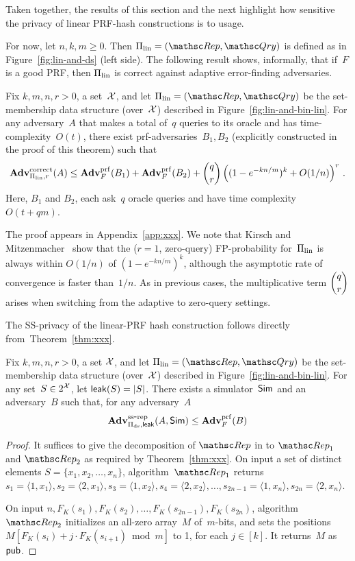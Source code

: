 Taken together, the results of this section and the next highlight how sensitive the privacy of linear PRF-hash constructions is to usage.


For now, let $n,k,m \geq 0$.  Then $\setprim_{\mathrm{lin}}= (\Rep, \Qry)$ is defined as in Figure~\ref{fig:lin-and-ds} (left side).  The following result shows, informally, that if~$F$ is a good PRF, then $\Pi_{\mathrm{lin}}$ is correct against adaptive error-finding adversaries.

\begin{theorem}\label{thm1}\label{thm:lin-correctness}
Fix $k,m,n,r>0$, a set~${\cal X}$, and let $\setprim_{\mathrm{lin}}= (\Rep, \Qry)$ be the set-membership data structure (over~${\cal X}$) described in Figure~\ref{fig:lin-and-bin-lin}.  For any adversary~$A$ that makes a total of~$q$ queries to its oracle and has time-complexity~$O(t)$, there exist prf-adversaries~$B_1,B_2$ (explicitly constructed in the proof of this theorem) such that
\[
\mathrm{\mathbf{Adv}}^{\mathrm{correct}}_{\Pi_{\mathrm{lin}},r}(A) \leq  \mathbf{Adv}^{\mathrm{prf}}_{F}(B_1) + \mathbf{Adv}^{\mathrm{prf}}_{F}(B_2)  +{\dbinom{q}{r}} \left( (1-e^{-kn/m})^k + O(1/n) \right)^r\,.
\]
Here, $B_1$ and $B_2$, each ask~$q$ oracle queries and have time complexity~$O(t+qm)$.
\end{theorem}
The proof appears in Appendix~\ref{app:xxx}.  We note that Kirsch and Mitzenmacher~\cite{xxx} show
that the ($r=1$, zero-query) FP-probability for~$\Pi_\mathrm{lin}$ is
always within $O(1/n)$ of $(1-e^{-kn/m})^k$, although the asymptotic
rate of convergence is faster than~$1/n$.   As in previous cases, the multiplicative term $\dbinom{q}{r}$ arises when switching from the adaptive to zero-query settings.

The SS-privacy of the linear-PRF hash construction follows directly from~Theorem~\ref{thm:xxx}.
\begin{theorem}\label{thm:lin-privacy}
Fix $k,m,n,r>0$, a set ${\cal X}$, and let $\setprim_{\mathrm{lin}}= (\Rep, \Qry)$ be the set-membership data structure (over~${\cal X}$) described in Figure~\ref{fig:lin-and-bin-lin}. For any set~$S \in 2^{{\cal X}}$, let ${\sf leak}(S)=|S|$.  There exists a simulator~${\sf Sim}$ and an adversary~$B$ such that, for any adversary~$A$
\[
\mathrm{\mathbf{Adv}}^{\mathrm{ss\mbox{-}rep}}_{\Pi_{\mathrm{ds}},{\sf leak}}(A,{\sf Sim}) \leq  \mathbf{Adv}^{\mathrm{prf}}_{F}(B)
\]
\end{theorem}
\begin{proof}
It suffices to give the decomposition of $\Rep$ in to $\Rep_1$ and $\Rep_2$ as required by Theorem~\ref{thm:xxx}.
On input a set of distinct elements
$S=\{x_1,x_2,\ldots,x_n\}$, algorithm~$\Rep_1$ returns $s_1=\langle 1,x_1 \rangle, s_2=\langle 2,x_1 \rangle, s_3 = \langle 1,x_2\rangle, s_4=\langle 2,x_2 \rangle,\ldots,s_{2n-1}=\langle 1,x_n \rangle, s_{2n}=\langle 2,x_n \rangle$.

On input $n,F_K(s_1),F_K(s_2),\ldots,F_K(s_{2n-1}) , F_K(s_{2n})$, algorithm $\Rep_2$ initializes an all-zero array~$M$ of~$m$-bits, and sets the positions $M[F_K(s_i)+j\cdot F_K(s_{i+1})\bmod m]$ to 1, for each $j \in [k]$.  It returns~$M$ as ${\sf pub}$.
\end{proof}


